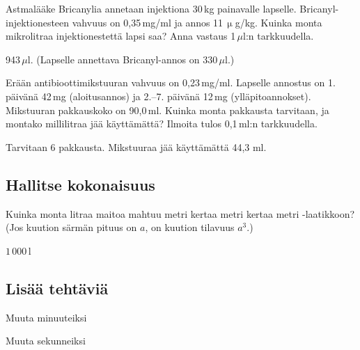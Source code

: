 \begin{tehtavasivu}
\begin{tehtava}
Astmalääke Bricanylia annetaan injektiona 30\,kg painavalle lapselle. Bricanyl-injektionesteen vahvuus on 0,35\,mg/ml ja annos 11\,$\upmu$g/kg. Kuinka monta mikrolitraa injektionestettä lapsi saa? Anna vastaus 1\,$\mu$l:n tarkkuudella. %
 \begin{vastaus}
943\,$\mu$l. (Lapselle annettava Bricanyl-annos on 330\,$\mu$l.) %
 \end{vastaus}
\end{tehtava}

\begin{tehtava}
Erään antibioottimikstuuran vahvuus on 0,23\,mg/ml. Lapselle annostus on 1. päivänä 42\,mg (aloitusannos) 
ja 2.--7. päivänä 12\,mg (ylläpitoannokset). Mikstuuran pakkauskoko on 90,0\,ml. Kuinka monta pakkausta tarvitaan, ja montako millilitraa jää käyttämättä? Ilmoita tulos 0,1\,ml:n tarkkuudella.
 \begin{vastaus}
Tarvitaan 6 pakkausta. Mikstuuraa jää käyttämättä 44,3 ml.
 \end{vastaus}
\end{tehtava}

\subsection*{Hallitse kokonaisuus}

\begin{tehtava}
Kuinka monta litraa maitoa mahtuu metri kertaa metri kertaa metri -laatikkoon? (Jos kuution särmän pituus on $a$, on kuution tilavuus $a^3$.)
	\begin{vastaus}
	$1\,000$\,l
	\end{vastaus}
\end{tehtava}

\subsection*{Lisää tehtäviä}


\begin{tehtava}
Muuta minuuteiksi
\begin{vastaus}
\end{vastaus}
\end{tehtava}
\begin{tehtava}
Muuta sekunneiksi
\begin{vastaus}
\end{vastaus}
\end{tehtava}


\end{tehtavasivu}
